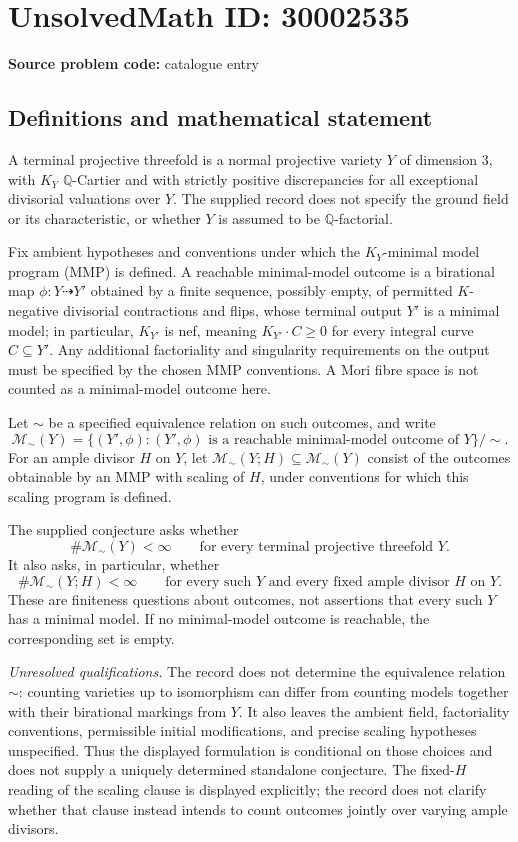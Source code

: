 \documentclass[11pt]{article}
\newcommand{\Q}{\mathbb{Q}}
\begin{document}
\section*{UnsolvedMath ID: 30002535}
\textbf{Source problem code:} catalogue entry
\subsection{Definitions and mathematical statement}
A terminal projective threefold is a normal projective variety \(Y\) of dimension \(3\), with \(K_Y\) \(\Q\)-Cartier and with strictly positive discrepancies for all exceptional divisorial valuations over \(Y\). The supplied record does not specify the ground field or its characteristic, or whether \(Y\) is assumed to be \(\Q\)-factorial.

Fix ambient hypotheses and conventions under which the \(K_Y\)-minimal model program (MMP) is defined. A reachable minimal-model outcome is a birational map \(\phi\colon Y\dashrightarrow Y'\) obtained by a finite sequence, possibly empty, of permitted \(K\)-negative divisorial contractions and flips, whose terminal output \(Y'\) is a minimal model; in particular, \(K_{Y'}\) is nef, meaning \(K_{Y'}\cdot C\geq 0\) for every integral curve \(C\subseteq Y'\). Any additional factoriality and singularity requirements on the output must be specified by the chosen MMP conventions. A Mori fibre space is not counted as a minimal-model outcome here.

Let \(\sim\) be a specified equivalence relation on such outcomes, and write
\[
\mathcal M_{\sim}(Y)
 =\bigl\{(Y',\phi): (Y',\phi)\text{ is a reachable minimal-model outcome of }Y\bigr\}/\!\sim.
\]
For an ample divisor \(H\) on \(Y\), let \(\mathcal M_{\sim}(Y;H)\subseteq\mathcal M_{\sim}(Y)\) consist of the outcomes obtainable by an MMP with scaling of \(H\), under conventions for which this scaling program is defined.

The supplied conjecture asks whether
\[
\#\mathcal M_{\sim}(Y)<\infty
\qquad\text{for every terminal projective threefold }Y.
\]
It also asks, in particular, whether
\[
\#\mathcal M_{\sim}(Y;H)<\infty
\qquad\text{for every such }Y\text{ and every fixed ample divisor }H\text{ on }Y.
\]
These are finiteness questions about outcomes, not assertions that every such \(Y\) has a minimal model. If no minimal-model outcome is reachable, the corresponding set is empty.

\emph{Unresolved qualifications.} The record does not determine the equivalence relation \(\sim\): counting varieties up to isomorphism can differ from counting models together with their birational markings from \(Y\). It also leaves the ambient field, factoriality conventions, permissible initial modifications, and precise scaling hypotheses unspecified. Thus the displayed formulation is conditional on those choices and does not supply a uniquely determined standalone conjecture. The fixed-\(H\) reading of the scaling clause is displayed explicitly; the record does not clarify whether that clause instead intends to count outcomes jointly over varying ample divisors.
\end{document}
